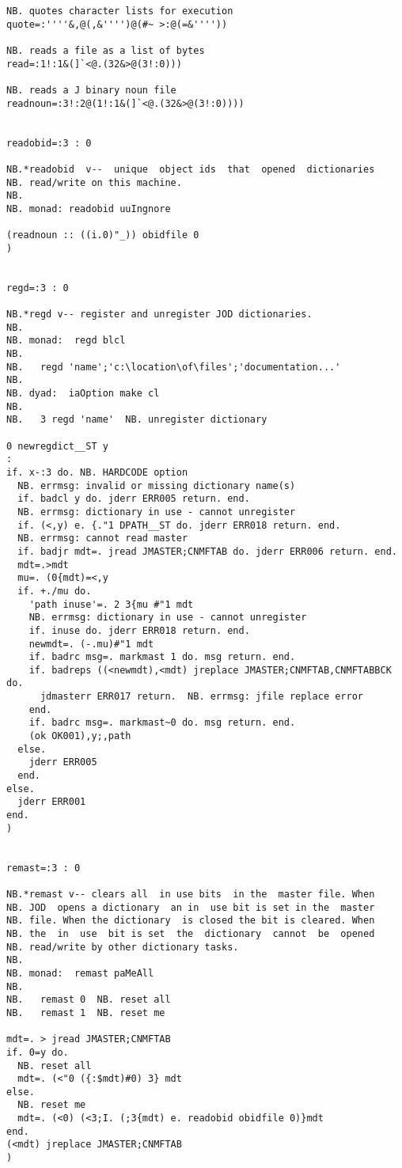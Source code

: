 \begin{lstlisting}[frame=single,framerule=0pt,basicstyle=\ttfamily\tiny]
NB. quotes character lists for execution
quote=:''''&,@(,&'''')@(#~ >:@(=&''''))

NB. reads a file as a list of bytes
read=:1!:1&(]`<@.(32&>@(3!:0)))

NB. reads a J binary noun file
readnoun=:3!:2@(1!:1&(]`<@.(32&>@(3!:0))))


readobid=:3 : 0

NB.*readobid  v--  unique  object ids  that  opened  dictionaries
NB. read/write on this machine.
NB.
NB. monad: readobid uuIngnore

(readnoun :: ((i.0)"_)) obidfile 0
)


regd=:3 : 0

NB.*regd v-- register and unregister JOD dictionaries.
NB.
NB. monad:  regd blcl
NB.
NB.   regd 'name';'c:\location\of\files';'documentation...'
NB.
NB. dyad:  iaOption make cl
NB.
NB.   3 regd 'name'  NB. unregister dictionary

0 newregdict__ST y
:
if. x-:3 do. NB. HARDCODE option
  NB. errmsg: invalid or missing dictionary name(s)
  if. badcl y do. jderr ERR005 return. end.
  NB. errmsg: dictionary in use - cannot unregister
  if. (<,y) e. {."1 DPATH__ST do. jderr ERR018 return. end.
  NB. errmsg: cannot read master
  if. badjr mdt=. jread JMASTER;CNMFTAB do. jderr ERR006 return. end.
  mdt=.>mdt
  mu=. (0{mdt)=<,y
  if. +./mu do.
    'path inuse'=. 2 3{mu #"1 mdt
    NB. errmsg: dictionary in use - cannot unregister
    if. inuse do. jderr ERR018 return. end.
    newmdt=. (-.mu)#"1 mdt
    if. badrc msg=. markmast 1 do. msg return. end.
    if. badreps ((<newmdt),<mdt) jreplace JMASTER;CNMFTAB,CNMFTABBCK do.
      jdmasterr ERR017 return.  NB. errmsg: jfile replace error
    end.
    if. badrc msg=. markmast~0 do. msg return. end.
    (ok OK001),y;,path
  else.
    jderr ERR005
  end.
else.
  jderr ERR001
end.
)


remast=:3 : 0

NB.*remast v-- clears all  in use bits  in the  master file. When
NB. JOD  opens a dictionary  an in  use bit is set in the  master
NB. file. When the dictionary  is closed the bit is cleared. When
NB. the  in  use  bit is set  the  dictionary  cannot  be  opened
NB. read/write by other dictionary tasks.
NB.
NB. monad:  remast paMeAll
NB.
NB.   remast 0  NB. reset all
NB.   remast 1  NB. reset me

mdt=. > jread JMASTER;CNMFTAB
if. 0=y do.
  NB. reset all
  mdt=. (<"0 ({:$mdt)#0) 3} mdt
else.
  NB. reset me
  mdt=. (<0) (<3;I. (;3{mdt) e. readobid obidfile 0)}mdt
end.
(<mdt) jreplace JMASTER;CNMFTAB
)



\end{lstlisting}
